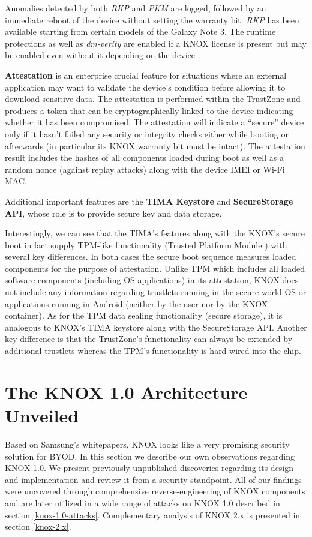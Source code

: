 \documentclass[11pt]{article}
\begin{document}
Anomalies detected by both \emph{RKP} and \emph{PKM} are logged, followed by an immediate reboot of the device without setting the warranty bit. 
\emph{RKP} has been available starting from certain models of the Galaxy Note 3.
The runtime protections as well as \emph{dm-verity} are enabled if a KNOX license is present but may be enabled even without it depending on the device  \cite{SamsungCorrespondence}.

\textbf{Attestation} is an enterprise crucial feature for situations where an external application may want to validate the device's condition before 
allowing it to download sensitive data. 
The attestation is performed within the TrustZone and produces a token that can be cryptographically linked to the device indicating whether it has been 
compromised. The attestation will indicate a ``secure'' device only if it hasn't failed any security or integrity checks either while booting or 
afterwards (in particular its KNOX warranty bit must be intact). The attestation result includes the hashes of all components loaded during boot as well 
as a random nonce (against replay attacks) along with the device IMEI or Wi-Fi MAC. 

Additional important features are the \textbf{TIMA Keystore} and \textbf{SecureStorage API}, whose role is to provide secure key and data storage.

Interestingly, we can see that the TIMA's features along with the KNOX's secure boot in fact supply TPM-like functionality (Trusted Platform Module \cite{TPMSpec}) 
with several key differences. In both cases the secure boot sequence measures loaded components for the purpose of attestation.
Unlike TPM which includes all loaded software components (including OS applications) in its attestation, KNOX does not include any information 
regarding trustlets running in the secure world OS or applications running in Android (neither by the user nor by the KNOX container).
As for the TPM data sealing functionality (secure storage), it is analogous to KNOX's TIMA keystore along with the SecureStorage API.
Another key difference is that the TrustZone's functionality can always be extended by additional trustlets whereas the TPM's 
functionality is hard-wired into the chip. 

\section{The KNOX 1.0 Architecture Unveiled} \label{knox-1.0-arch}
Based on Samsung's whitepapers, KNOX looks like a very promising security solution for BYOD.
In this section we describe our own observations regarding KNOX 1.0.
We present previously unpublished discoveries regarding its design and implementation and review it from a security standpoint.  
All of our findings were uncovered through comprehensive reverse-engineering of KNOX components and are later utilized in a wide 
range of attacks on KNOX 1.0 described in section \ref{knox-1.0-attacks}.
Complementary analysis of KNOX 2.x is presented in section \ref{knox-2.x}.
\end{document}
